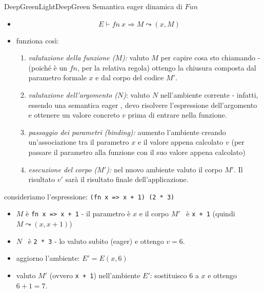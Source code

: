 \documentclass[a4paper,11pt]{report}
\begin{document}
\begin{cdefframe}{DeepGreenLight}{DeepGreen} {Semantica eager dinamica di \( Fun \)}{}

    \begin{itemize}
        \item {}

\vspace{-1em}
    \[  E \vdash fn \ x \Rightarrow M \leadsto (x, M) \]

\item {}

\begin{prooftree}
\end{prooftree}

funziona così:
\begin{enumerate}
    \item \textit{valutazione della funzione (\(M\)):} 
    valuto \( M \) per capire cosa sto chiamando - (poiché è un \( fn \), per la relativa regola) ottengo la chiusura composta dal parametro formale \( x \) e dal corpo del codice \( M' \).

\item \textit{valutazione dell'argomento (\(N\))}:
    valuto \( N \) nell'ambiente corrente - infatti, essendo una semantica eager , devo risolvere l'espressione dell'argomento e ottenere un valore concreto \( v \) prima di entrare nella funzione.

    \item \textit{passaggio dei parametri (binding):} 
    aumento l'ambiente creando un'associazione tra il parametro \( x \) e il valore appena calcolato \( v \) (per passare il parametro alla funzione con il suo valore appena calcolato)

    \item \textit{esecuzione del corpo (\(M'\)):} 
    nel nuovo ambiente valuto il corpo \( M' \). Il risultato \( v' \) sarà il risultato finale dell'applicazione.
\end{enumerate}

\end{itemize}

\end{cdefframe}

consideriamo l'espressione: \texttt{(fn x => x + 1) (2 * 3)}
\begin{itemize}
    \item \( M \) è \texttt{fn x => x + 1} - il parametro è \( x \) e il corpo \( M' \) \ è \texttt{x + 1} {\color{gray}(quindi \( M\leadsto (x, x+1) \))}
    \item \( N \) \ è \texttt{2 * 3} - lo valuto subito (eager) e ottengo \( v = 6 \).
    \item aggiorno l'ambiente: \( E' = E (x,6) \)
    \item valuto \( M' \) (ovvero \texttt{x + 1}) nell'ambiente \( E' \): sostituisco \( 6 \) a \( x \) e ottengo \( 6+1=7 \).
\end{itemize}
\end{document}
